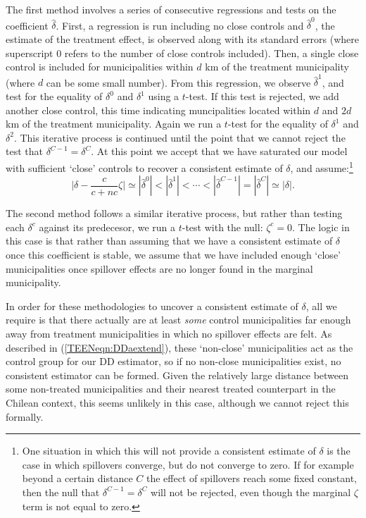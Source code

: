 The first method involves a series of consecutive regressions and tests on the
coefficient $\widehat\delta$.  First, a regression is run including no close
controls and $\hat\delta^0$, the estimate of the treatment effect, is observed 
along with its standard errors (where superscript 0 refers to the number of 
close controls included).  Then, a single close control is included for 
municipalities within $d$ km of the treatment municipality (where $d$ can be 
some small number).  From this regression, we observe $\hat\delta^1$, and test 
for the equality of $\delta^0$  and $\delta^1$ using a $t$-test.  If this test 
is rejected, we add another close control, this time indicating muncipalities 
located within $d$ and $2d$ km of the treatment municipality.  Again we run a 
$t$-test for the equality of $\delta^1$ and $\delta^2$.  This iterative process 
is continued until the point that we cannot reject the test that $\delta^{C-1}=
\delta^C$.  At this point we accept that we have saturated our model with 
sufficient `close' controls to recover a consistent estimate of $\delta$, and 
assume:\footnote{One situation in which this will not provide a consistent 
estimate of $\delta$ is the case in which spillovers converge, but do not 
converge to zero.  If for example beyond a certain distance $C$ the effect of 
spillovers reach some fixed constant, then the null that $\delta^{C-1}=
\delta^C$ will not be rejected, even though the marginal $\zeta$ term is not 
equal to zero.}
\begin{equation}
\label{TEENeqn:inequalitiesDelta}
\bigg|\delta-\frac{c}{c+nc}\zeta\bigg|\simeq|\hat\delta^0|<|\hat\delta^1|<\cdots<
|\hat\delta^{C-1}|=|\hat\delta^C|\simeq|\delta|.
\end{equation}

The second method follows a similar iterative process, but rather than testing
each $\delta^c$ against its predecesor, we run a $t$-test with the null:
$\zeta^c=0$.  The logic in this case is that rather than assuming that we
have a consistent estimate of $\delta$ once this coefficient is stable, we
assume that we have included enough `close' municipalities once spillover 
effects are no longer found in the marginal municipality.

In order for these methodologies to uncover a consistent estimate of $\delta$,
all we require is that there actually are at least \emph{some} control 
municipalities far enough away from treatment municipalities in which no 
spillover effects are felt.  As described in (\ref{TEENeqn:DDaextend}), these 
`non-close' municipalities act as the control group for our DD estimator, 
so if no non-close municipalities exist, no consistent estimator can be formed.  
Given the relatively large distance between some non-treated municipalities and 
their nearest treated counterpart in the Chilean context, this seems unlikely in 
this case, although we cannot reject this formally.

